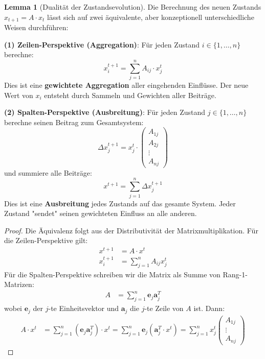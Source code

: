 \documentclass[a4paper,12pt]{report}
\theoremstyle{definition}
\newtheorem{lemma}{Lemma}
\begin{document}
	\begin{lemma}[Dualität der Zustandsevolution]
		Die Berechnung des neuen Zustands $x_{t+1} = A \cdot x_t$ lässt sich auf zwei äquivalente, aber konzeptionell unterschiedliche Weisen durchführen:
		
		\textbf{(1) Zeilen-Perspektive (Aggregation)}:
		Für jeden Zustand $i \in \{1,\ldots,n\}$ berechne:
		\[
		x_i^{t+1} = \sum_{j=1}^{n} A_{ij} \cdot x_j^t
		\]
		Dies ist eine \textbf{gewichtete Aggregation} aller eingehenden Einflüsse. Der neue Wert von $x_i$ entsteht durch Sammeln und Gewichten aller Beiträge.
		
		\textbf{(2) Spalten-Perspektive (Ausbreitung)}:
		Für jeden Zustand $j \in \{1,\ldots,n\}$ berechne seinen Beitrag zum Gesamtsystem:
		\[
		\Delta x^{t+1}_j = x_j^t \cdot \begin{pmatrix} A_{1j} \\ A_{2j} \\ \vdots \\ A_{nj} \end{pmatrix}
		\]
		und summiere alle Beiträge:
		\[
		x^{t+1} = \sum_{j=1}^{n} \Delta x^{t+1}_j
		\]
		Dies ist eine \textbf{Ausbreitung} jedes Zustands auf das gesamte System. Jeder Zustand "sendet" seinen gewichteten Einfluss an alle anderen.
	\end{lemma}
	
	\begin{proof}
		Die Äquivalenz folgt aus der Distributivität der Matrixmultiplikation. Für die Zeilen-Perspektive gilt:
		\begin{align}
			x^{t+1} &= A \cdot x^t \\
			x_i^{t+1} &= \sum_{j=1}^n A_{ij} x_j^t
		\end{align}
		Für die Spalten-Perspektive schreiben wir die Matrix als Summe von Rang-1-Matrizen:
		\begin{align}
			A &= \sum_{j=1}^n \mathbf{e}_j \mathbf{a}_j^T
		\end{align}
		wobei $\mathbf{e}_j$ der $j$-te Einheitsvektor und $\mathbf{a}_j$ die $j$-te Zeile von $A$ ist. Dann:
		\begin{align}
			A \cdot x^t &= \sum_{j=1}^n (\mathbf{e}_j \mathbf{a}_j^T) \cdot x^t = \sum_{j=1}^n \mathbf{e}_j (\mathbf{a}_j^T \cdot x^t) = \sum_{j=1}^n x_j^t \begin{pmatrix} A_{1j} \\ \vdots \\ A_{nj} \end{pmatrix}
		\end{align}
	\end{proof}
	
\end{document}
